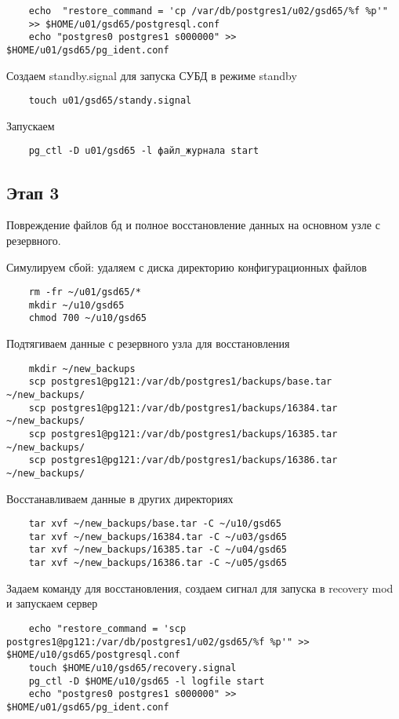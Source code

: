 \documentclass{article}
\begin{document}
\begin{verbatim}
    echo  "restore_command = 'cp /var/db/postgres1/u02/gsd65/%f %p'" 
    >> $HOME/u01/gsd65/postgresql.conf
    echo "postgres0 postgres1 s000000" >> $HOME/u01/gsd65/pg_ident.conf 
\end{verbatim}

Создаем standby.signal для запуска СУБД в режиме standby
\begin{verbatim}
    touch u01/gsd65/standy.signal
\end{verbatim}

Запускаем
\begin{verbatim}
    pg_ctl -D u01/gsd65 -l файл_журнала start
\end{verbatim}

\subsection{Этап 3}
Повреждение файлов бд и полное восстановление данных на основном узле с резервного. 

Симулируем сбой: удаляем с диска директорию конфигурационных файлов
\begin{verbatim}
    rm -fr ~/u01/gsd65/*
    mkdir ~/u10/gsd65
    chmod 700 ~/u10/gsd65
\end{verbatim}

Подтягиваем данные с резервного узла для восстановления
\begin{verbatim}
    mkdir ~/new_backups
    scp postgres1@pg121:/var/db/postgres1/backups/base.tar ~/new_backups/
    scp postgres1@pg121:/var/db/postgres1/backups/16384.tar ~/new_backups/
    scp postgres1@pg121:/var/db/postgres1/backups/16385.tar ~/new_backups/
    scp postgres1@pg121:/var/db/postgres1/backups/16386.tar ~/new_backups/
\end{verbatim}

Восстанавливаем данные в других директориях
\begin{verbatim}
    tar xvf ~/new_backups/base.tar -C ~/u10/gsd65
    tar xvf ~/new_backups/16384.tar -C ~/u03/gsd65
    tar xvf ~/new_backups/16385.tar -C ~/u04/gsd65
    tar xvf ~/new_backups/16386.tar -C ~/u05/gsd65
\end{verbatim}
Задаем команду для восстановления, создаем сигнал для запуска в recovery mod и запускаем сервер
\begin{verbatim}
    echo "restore_command = 'scp postgres1@pg121:/var/db/postgres1/u02/gsd65/%f %p'" >> $HOME/u10/gsd65/postgresql.conf
    touch $HOME/u10/gsd65/recovery.signal
    pg_ctl -D $HOME/u10/gsd65 -l logfile start
    echo "postgres0 postgres1 s000000" >> $HOME/u01/gsd65/pg_ident.conf 
\end{verbatim}
\end{document}
